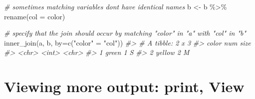 \documentclass[
]{book}
\newenvironment{Shaded}{\begin{snugshade}}{\end{snugshade}}
\newcommand{\AttributeTok}[1]{\textcolor[rgb]{0.77,0.63,0.00}{#1}}
\newcommand{\CommentTok}[1]{\textcolor[rgb]{0.56,0.35,0.01}{\textit{#1}}}
\newcommand{\FunctionTok}[1]{\textcolor[rgb]{0.00,0.00,0.00}{#1}}
\newcommand{\NormalTok}[1]{#1}
\newcommand{\OtherTok}[1]{\textcolor[rgb]{0.56,0.35,0.01}{#1}}
\newcommand{\SpecialCharTok}[1]{\textcolor[rgb]{0.00,0.00,0.00}{#1}}
\newcommand{\StringTok}[1]{\textcolor[rgb]{0.31,0.60,0.02}{#1}}
\begin{document}
\begin{Shaded}
\begin{Highlighting}[]
\CommentTok{\# sometimes matching variables don\textquotesingle{}t have identical names}
\NormalTok{b }\OtherTok{\textless{}{-}}\NormalTok{ b }\SpecialCharTok{\%\textgreater{}\%} \FunctionTok{rename}\NormalTok{(}\AttributeTok{col =}\NormalTok{ color)}

\CommentTok{\# specify that the join should occur by matching "color" in "a" with "col" in "b"}
\FunctionTok{inner\_join}\NormalTok{(a, b, }\AttributeTok{by=}\FunctionTok{c}\NormalTok{(}\StringTok{"color"} \OtherTok{=} \StringTok{"col"}\NormalTok{))}
\CommentTok{\#\textgreater{} \# A tibble: 2 x 3}
\CommentTok{\#\textgreater{}   color    num size }
\CommentTok{\#\textgreater{}   \textless{}chr\textgreater{}  \textless{}int\textgreater{} \textless{}chr\textgreater{}}
\CommentTok{\#\textgreater{} 1 green      1 S    }
\CommentTok{\#\textgreater{} 2 yellow     2 M}
\end{Highlighting}
\end{Shaded}

\hypertarget{viewing-more-output-print-view}{%
\chapter{Viewing more output: print, View}\label{viewing-more-output-print-view}}
\end{document}
